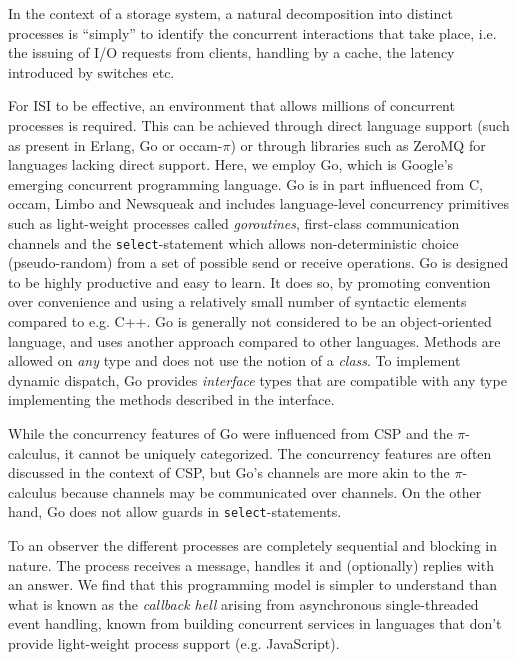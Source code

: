 In the context of a storage system, a natural decomposition into distinct
processes is ``simply'' to identify the concurrent interactions that take
place, i.e. the issuing of I/O requests from clients, handling by a cache, the
latency introduced by switches etc.

For ISI to be effective, an environment that allows millions of concurrent
processes is required. This can be achieved through direct language support
(such as present in Erlang\cite{erlang}, Go\cite{Go} or
occam-$\pi$\cite{occam-pi}) or through libraries such as ZeroMQ\cite{zeromq} for
languages lacking direct support. Here, we employ Go, which is Google's
emerging concurrent programming language. Go is in part influenced from C,
occam, Limbo\cite{limbo} and Newsqueak\cite{newsqueak} and includes
language-level concurrency primitives such as light-weight processes called
\emph{goroutines}, first-class communication channels and the
\verb|select|-statement which allows non-deterministic choice
(pseudo-random) from a set of possible send or receive operations. Go is
designed to be highly productive and easy to learn. It does so, by promoting
convention over convenience and using a relatively small number of syntactic
elements compared to e.g. C++. Go is generally not considered to be an
object-oriented language, and uses another approach compared to other
languages. Methods are allowed on \emph{any} type and does not use the notion
of a \emph{class}. To implement dynamic dispatch, Go provides \emph{interface}
types that are compatible with any type implementing the methods described in
the interface\cite{goref}.

While the concurrency features of Go were influenced from CSP and the $\pi$-calculus,
it cannot be uniquely categorized. The concurrency features are often discussed
in the context of CSP, but Go's channels are more akin to the $\pi$-calculus
because channels may be communicated over channels. On the other hand, Go does not
allow guards in \verb|select|-statements.

To an observer the different processes are completely sequential and blocking
in nature. The process receives a message, handles it and (optionally)
replies with an answer. We find that this programming model is simpler to
understand than what is known as the \emph{callback hell}\cite{callback-hell} arising from
asynchronous single-threaded event handling, known from building concurrent
services in languages that don't provide light-weight process support (e.g.
JavaScript).


